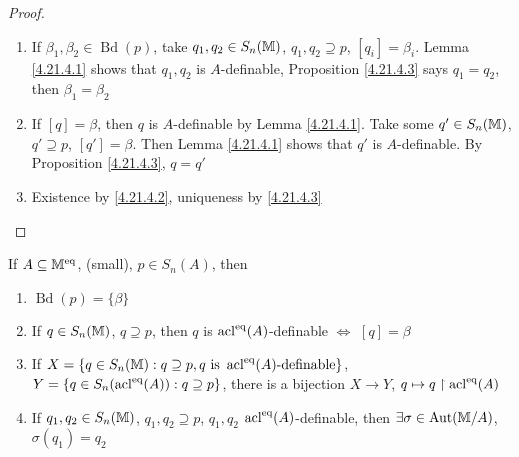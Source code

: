 \documentclass[11pt]{article}
\DeclareMathOperator{\Bd}{Bd}
\begin{document}
\begin{proof}
\begin{enumerate}
\item If \(\beta_1,\beta_2\in\Bd(p)\), take \(q_1,q_2\in S_n(\mathbb{M})\), \(q_1,q_2\supseteq p\), \([q_i]=\beta_i\). Lemma \ref{4.21.4.1}
shows that \(q_1,q_2\) is \(A\)-definable, Proposition \ref{4.21.4.3} says \(q_1=q_2\), then \(\beta_1=\beta_2\)
\item If \([q]=\beta\), then \(q\) is \(A\)-definable by Lemma \ref{4.21.4.1}. Take
some \(q'\in S_n(\mathbb{M})\), \(q'\supseteq p\), \([q']=\beta\). Then Lemma \ref{4.21.4.1} shows that \(q'\)
is \(A\)-definable. By Proposition \ref{4.21.4.3}, \(q=q'\)
\item Existence by \ref{4.21.4.2}, uniqueness by \ref{4.21.4.3}
\end{enumerate}
\end{proof}

\begin{theorem}
\label{4.21.4.5}
If \(A\subseteq\mathbb{M}^{\operatorname{eq}}\), (small), \(p\in S_n(A)\), then
\begin{enumerate}
\item \(\Bd(p)=\{\beta\}\)
\item If \(q\in S_n(\mathbb{M})\), \(q\supseteq p\), then \(q\) is \(\operatorname{acl}^{\operatorname{eq}}(A)\)-definable \(\Leftrightarrow\) \([q]=\beta\)
\item If \(X=\{q\in S_n(\mathbb{M}):q\supseteq p,q\text{ is }\operatorname{acl}^{\operatorname{eq}}(A)\text{-definable}\}\),
\(Y=\{q\in S_n(\operatorname{acl}^{\operatorname{eq}}(A)):q\supseteq p\}\), there is a bijection \(X\to Y\), \(q\mapsto q\upharpoonright\operatorname{acl}^{\operatorname{eq}}(A)\)
\item If \(q_1,q_2\in S_n(\mathbb{M})\), \(q_1,q_2\supseteq p\), \(q_1,q_2\) \(\operatorname{acl}^{\operatorname{eq}}(A)\)-definable,
then \(\exists \sigma\in\operatorname{\text{Aut}}(\mathbb{M}/A)\), \(\sigma(q_1)=q_2\)
\end{enumerate}
\end{theorem}
\end{document}
